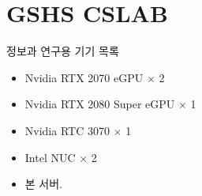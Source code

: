 \chapter{GSHS CSLAB}
정보과 연구용 기기 목록
\begin{itemize}
    \item Nvidia RTX 2070 eGPU $\times$ 2
    \item Nvidia RTX 2080 Super eGPU $\times$ 1
    \item Nvidia RTC 3070 $\times$ 1 
    \item Intel NUC $\times$ 2
    \item 본 서버.
\end{itemize}
